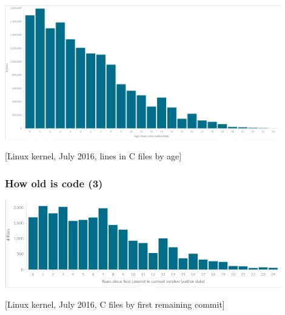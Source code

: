 \documentclass[17pt,aspectratio=169,hyperref=pdfusetitle]{beamer}
\begin{document}
\begin{frame}

\begin{center}
  \includegraphics[width=12cm]{figs/linux-age-c}
\end{center}

[Linux kernel, July 2016, lines in C files by age]

\end{frame}

\begin{frame}
\frametitle{How old is code (3)}

\begin{center}
  \includegraphics[width=12cm]{figs/linux-files-first-edit-c}
\end{center}

[Linux kernel, July 2016, C files by first remaining commit]

\end{frame}
\end{document}
